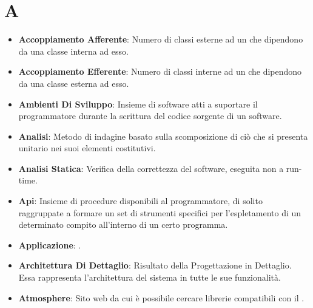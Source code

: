 \section*{A}
\begin{itemize}
	\item
	\textbf{Accoppiamento Afferente}: Numero di classi esterne ad un  che dipendono da una classe interna ad esso.
	\item
	\textbf{Accoppiamento Efferente}: Numero di classi interne ad un  che dipendono da una classe esterna ad esso.
	\item
	\textbf{Ambienti Di Sviluppo}: Insieme di software atti a suportare il programmatore durante la scrittura del codice sorgente di un software.
	\item
	\textbf{Analisi}: Metodo di indagine basato sulla scomposizione di ciò che si presenta unitario nei suoi elementi costitutivi.
	\item
	\textbf{Analisi Statica}: Verifica della correttezza del software, eseguita non a run-time.
	\item
	\textbf{Api}: Insieme di procedure disponibili al programmatore, di solito raggruppate a formare un set di strumenti specifici per l'espletamento di un determinato compito all'interno di un certo programma.
	\item
	\textbf{Applicazione}: .
	\item
	\textbf{Architettura Di Dettaglio}: Risultato della Progettazione in Dettaglio. Essa rappresenta l'architettura del sistema in tutte le sue funzionalità.
	\item
	\textbf{Atmosphere}: Sito web da cui è possibile cercare librerie compatibili con il  .
\end{itemize}
\newpage